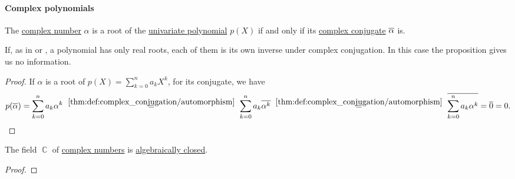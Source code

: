 \paragraph{Complex polynomials}

\begin{proposition}\label{thm:complex_conjugation_of_roots}
  The \hyperref[def:complex_numbers]{complex number} \( \alpha \) is a root of the \hyperref[def:univariate_polynomial]{univariate polynomial} \( p(X) \) if and only if its \hyperref[def:complex_conjugation]{complex conjugate} \( \oline \alpha \) is.
\end{proposition}
\begin{comments}
  \item If, as in  or , a polynomial has only real roots, each of them is its own inverse under complex conjugation. In this case the proposition gives us no information.
\end{comments}
\begin{proof}
  If \( \alpha \) is a root of \( p(X) = \sum_{k=0}^n a_k X^k \), for its conjugate, we have
  \begin{equation*}
    p(\oline \alpha)
    =
    \sum_{k=0}^n a_k \alpha^k
    \reloset {\ref{thm:def:complex_conjugation/automorphism}} =
    \sum_{k=0}^n a_k \oline{\alpha^k}
    \reloset {\ref{thm:def:complex_conjugation/automorphism}} =
    \oline{\sum_{k=0}^n a_k \alpha^k}
    =
    \oline 0
    =
    0.
  \end{equation*}
\end{proof}

\begin{theorem}\label{thm:fundamental_theorem_of_algebra}
  The field \( \BbbC \) of \hyperref[def:complex_numbers]{complex numbers} is \hyperref[def:algebraically_closed_field]{algebraically closed}.
\end{theorem}
\begin{proof}
\end{proof}
